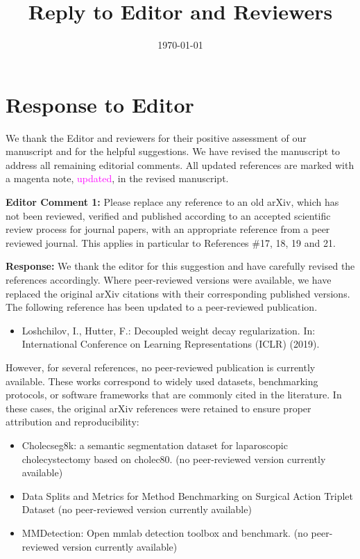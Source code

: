 \documentclass{article}
\title{Reply to Editor and Reviewers}
\author{}
\date{\today}
\begin{document}
\maketitle
\section*{Response to Editor}

We thank the Editor and reviewers for their positive assessment of our manuscript and for the helpful suggestions. We have revised the manuscript to address all remaining editorial comments. All updated references are marked with a magenta note, \textcolor{magenta}{updated}, in the revised manuscript.

\vspace{4mm}

\textbf{Editor Comment 1:} 
Please replace any reference to an old arXiv, which has not been reviewed, verified and published according to an accepted scientific review process for journal papers, with an appropriate reference from a peer reviewed journal. This applies in particular to References \#17, 18, 19 and 21.

\textbf{Response:} 
We thank the editor for this suggestion and have carefully revised the references accordingly. Where peer-reviewed versions were available, we have replaced the original arXiv citations with their corresponding published versions. The following reference has been updated to a peer-reviewed publication.

\begin{itemize}
\item[21] Loshchilov, I., Hutter, F.: Decoupled weight decay regularization. In: International Conference on Learning Representations (ICLR) (2019). 
\end{itemize}

However, for several references, no peer-reviewed publication is currently available. These works correspond to widely used datasets, benchmarking protocols, or software frameworks that are commonly cited in the literature. In these cases, the original arXiv references were retained to ensure proper attribution and reproducibility:

\begin{itemize}
\item[17] Cholecseg8k: a semantic segmentation dataset for laparoscopic cholecystectomy based on cholec80. (no peer-reviewed version currently available)
\item[18] Data Splits and Metrics for Method Benchmarking on Surgical Action Triplet Dataset (no peer-reviewed version currently available)
\item[19] MMDetection: Open mmlab detection toolbox and benchmark. (no peer-reviewed version currently available)
\end{itemize}
\end{document}
